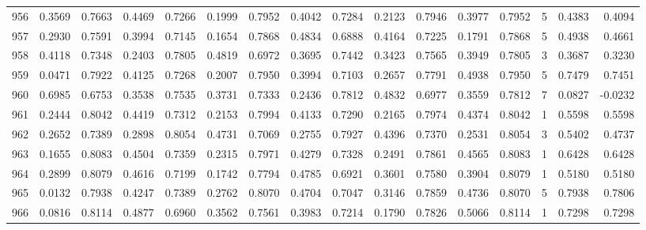 \begin{tabular}{lrrrrrrrrrrrrrrr}
956 &      0.3569 &  0.7663 &  0.4469 &  0.7266 &  0.1999 &  0.7952 &  0.4042 &  0.7284 &  0.2123 &  0.7946 &   0.3977 &     0.7952 &      5 &                    0.4383 &                     0.4094 \\
957 &      0.2930 &  0.7591 &  0.3994 &  0.7145 &  0.1654 &  0.7868 &  0.4834 &  0.6888 &  0.4164 &  0.7225 &   0.1791 &     0.7868 &      5 &                    0.4938 &                     0.4661 \\
958 &      0.4118 &  0.7348 &  0.2403 &  0.7805 &  0.4819 &  0.6972 &  0.3695 &  0.7442 &  0.3423 &  0.7565 &   0.3949 &     0.7805 &      3 &                    0.3687 &                     0.3230 \\
959 &      0.0471 &  0.7922 &  0.4125 &  0.7268 &  0.2007 &  0.7950 &  0.3994 &  0.7103 &  0.2657 &  0.7791 &   0.4938 &     0.7950 &      5 &                    0.7479 &                     0.7451 \\
960 &      0.6985 &  0.6753 &  0.3538 &  0.7535 &  0.3731 &  0.7333 &  0.2436 &  0.7812 &  0.4832 &  0.6977 &   0.3559 &     0.7812 &      7 &                    0.0827 &                    -0.0232 \\
961 &      0.2444 &  0.8042 &  0.4419 &  0.7312 &  0.2153 &  0.7994 &  0.4133 &  0.7290 &  0.2165 &  0.7974 &   0.4374 &     0.8042 &      1 &                    0.5598 &                     0.5598 \\
962 &      0.2652 &  0.7389 &  0.2898 &  0.8054 &  0.4731 &  0.7069 &  0.2755 &  0.7927 &  0.4396 &  0.7370 &   0.2531 &     0.8054 &      3 &                    0.5402 &                     0.4737 \\
963 &      0.1655 &  0.8083 &  0.4504 &  0.7359 &  0.2315 &  0.7971 &  0.4279 &  0.7328 &  0.2491 &  0.7861 &   0.4565 &     0.8083 &      1 &                    0.6428 &                     0.6428 \\
964 &      0.2899 &  0.8079 &  0.4616 &  0.7199 &  0.1742 &  0.7794 &  0.4785 &  0.6921 &  0.3601 &  0.7580 &   0.3904 &     0.8079 &      1 &                    0.5180 &                     0.5180 \\
965 &      0.0132 &  0.7938 &  0.4247 &  0.7389 &  0.2762 &  0.8070 &  0.4704 &  0.7047 &  0.3146 &  0.7859 &   0.4736 &     0.8070 &      5 &                    0.7938 &                     0.7806 \\
966 &      0.0816 &  0.8114 &  0.4877 &  0.6960 &  0.3562 &  0.7561 &  0.3983 &  0.7214 &  0.1790 &  0.7826 &   0.5066 &     0.8114 &      1 &                    0.7298 &                     0.7298 \\

\end{tabular}
